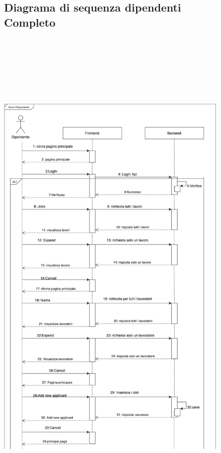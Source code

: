 \documentclass[ 4paper,11pt,openany]{book}
\begin{document}
	
\begin{figure}[htpb!] 
	\subsection{Diagrama di sequenza dipendenti Completo}
	\includegraphics[height=250mm,width=180mm]{Seq_Dipendenti_Completo1.jpeg}
\end{figure}
\end{document}
